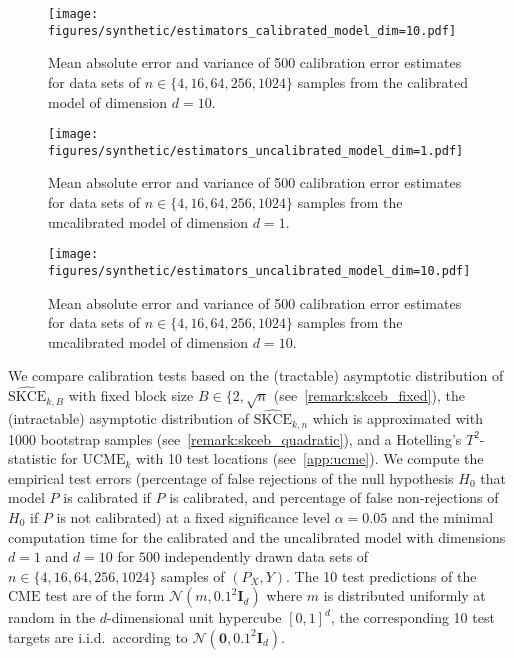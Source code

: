 \documentclass{article}
\begin{document}
\begin{figure}[hpt]
    \begin{center}
        \texttt{[image: figures/synthetic/estimators\_calibrated\_model\_dim=10.pdf]}
        \caption{Mean absolute error and variance of 500 calibration error estimates for
        data sets of $n \in \{4, 16, 64, 256, 1024\}$ samples from the calibrated model
        of dimension $d = 10$.}
        \label{fig:synthetic_estimators_calibrated_10}
    \end{center}
\end{figure}

\begin{figure}[hpt]
    \begin{center}
        \texttt{[image: figures/synthetic/estimators\_uncalibrated\_model\_dim=1.pdf]}
        \caption{Mean absolute error and variance of 500 calibration error estimates for
        data sets of $n \in \{4, 16, 64, 256, 1024\}$ samples from the uncalibrated model
        of dimension $d = 1$.}
        \label{fig:synthetic_estimators_uncalibrated_1}
    \end{center}
\end{figure}

\begin{figure}[hpt]
    \begin{center}
        \texttt{[image: figures/synthetic/estimators\_uncalibrated\_model\_dim=10.pdf]}
        \caption{Mean absolute error and variance of 500 calibration error estimates for
        data sets of $n \in \{4, 16, 64, 256, 1024\}$ samples from the uncalibrated model
        of dimension $d = 10$.}
        \label{fig:synthetic_estimators_uncalibrated_10}
    \end{center}
\end{figure}

We compare calibration tests based on the (tractable) asymptotic distribution of
$\widehat{\mathrm{SKCE}}_{k,B}$ with fixed block size $B \in \{2, \sqrt{n}$
(see~\cref{remark:skceb_fixed}), the (intractable) asymptotic distribution of
$\widehat{\mathrm{SKCE}}_{k,n}$ which is approximated with 1000 bootstrap
samples (see~\cref{remark:skceb_quadratic}), and a Hotelling's $T^2$-statistic for
$\mathrm{UCME}_k$ with 10 test locations (see~\cref{app:ucme}). We compute
the empirical test errors (percentage of false rejections of the null hypothesis $H_0$
that model $P$ is calibrated if $P$ is calibrated, and percentage of false non-rejections
of $H_0$ if $P$ is not calibrated) at a fixed significance level $\alpha = 0.05$ and
the minimal computation time for the calibrated and the uncalibrated model with
dimensions $d = 1$ and $d = 10$ for $500$ independently drawn data sets of
$n \in \{4, 16, 64, 256, 1024\}$ samples of $(P_X, Y)$. The 10 test
predictions of the $\mathrm{CME}$ test are of the form $\mathcal{N}(m, 0.1^2 \mathbf{I}_d)$
where $m$ is distributed uniformly at random in the $d$-dimensional unit hypercube $[0,1]^d$,
the corresponding 10 test targets are i.i.d.\ according to
$\mathcal{N}(\mathbf{0}, 0.1^2 \mathbf{I}_d)$.
\end{document}
